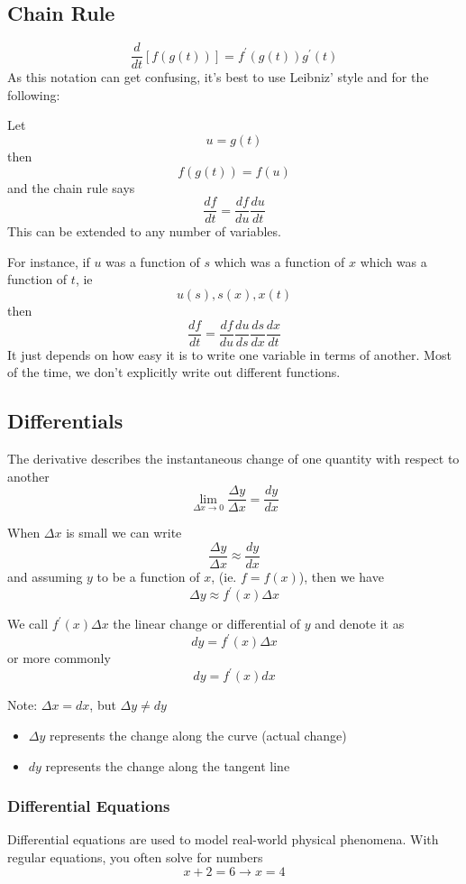 \documentclass[12pt]{article}
\begin{document}
\subsection*{Chain Rule}
\[ \frac{d}{dt}[f(g(t))] = f^\prime(g(t))g^\prime(t) \] As this notation can get confusing, it's best to use Leibniz' style and for the following:

Let \[ u = g(t) \] then \[ f(g(t)) = f(u) \] and the chain rule says \[ \frac{df}{dt} = \frac{df}{du}\frac{du}{dt} \] This can be extended to any number of variables.

For instance, if $u$ was a function of $s$ which was a function of $x$ which was a function of $t$, ie \[ u(s), s(x), x(t) \] then \[ \frac{df}{dt} = \frac{df}{du}\frac{du}{ds}\frac{ds}{dx}\frac{dx}{dt} \] It just depends on how easy it is to write one variable in terms of another. Most of the time, we don't explicitly write out different functions.

\subsection*{Differentials}
The derivative describes the instantaneous change of one quantity with respect to another \[ \lim_{\Delta x\to 0}\frac{\Delta y}{\Delta x} = \frac{dy}{dx} \]

When $\Delta x$ is small we can write \[ \frac{\Delta y}{\Delta x} \approx \frac{dy}{dx} \] and assuming $y$ to be a function of $x$, (ie. $f=f(x)$), then we have \[ \Delta y \approx f^\prime(x)\Delta x \]

We call $f^\prime(x)\Delta x$ the linear change or differential of $y$ and denote it as \[ dy = f^\prime(x)\Delta x \] or more commonly \[ dy = f^\prime(x)dx \]

Note: $\Delta x = dx$, but $\Delta y \neq dy$

\begin{itemize}
\item $\Delta y$ represents the change along the curve (actual change)
\item $dy$ represents the change along the tangent line
\end{itemize}

\subsubsection*{Differential Equations}
Differential equations are used to model real-world physical phenomena. With regular equations, you often solve for numbers \[ x+2 = 6 \to x=4 \]
\end{document}
